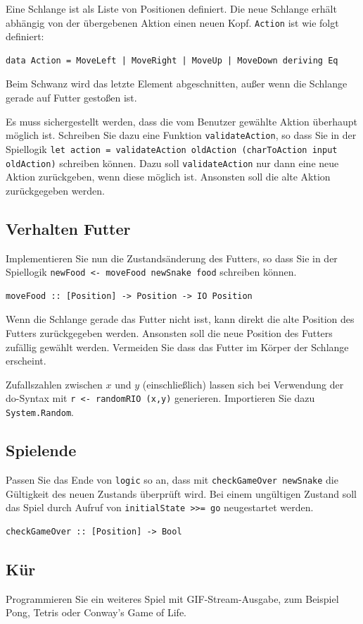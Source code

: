 \documentclass{scrartcl}
\begin{document}
Eine Schlange ist als Liste von Positionen definiert.
Die neue Schlange erhält abhängig von der übergebenen Aktion einen neuen Kopf.
\texttt{Action} ist wie folgt definiert:

\begin{lstlisting}
data Action = MoveLeft | MoveRight | MoveUp | MoveDown deriving Eq
\end{lstlisting}

Beim Schwanz wird das letzte Element abgeschnitten, außer wenn die Schlange gerade auf Futter gestoßen ist.

Es muss sichergestellt werden, dass die vom Benutzer gewählte Aktion überhaupt möglich ist.
Schreiben Sie dazu eine Funktion \texttt{validateAction}, so dass Sie in der Spiellogik \texttt{let action = validateAction oldAction (charToAction input oldAction)} schreiben können.
Dazu soll \texttt{validateAction} nur dann eine neue Aktion zurückgeben, wenn diese möglich ist.
Ansonsten soll die alte Aktion zurückgegeben werden.


\subsection{Verhalten Futter}
Implementieren Sie nun die Zustandsänderung des Futters, so dass Sie in der Spiellogik \texttt{newFood <- moveFood newSnake food} schreiben können.

\begin{lstlisting}
moveFood :: [Position] -> Position -> IO Position
\end{lstlisting}

Wenn die Schlange gerade das Futter nicht isst, kann direkt die alte Position des Futters zurückgegeben werden.
Ansonsten soll die neue Position des Futters zufällig gewählt werden.
Vermeiden Sie dass das Futter im Körper der Schlange erscheint.

Zufallszahlen zwischen $x$ und $y$ (einschließlich) lassen sich bei Verwendung der do-Syntax mit \texttt{r <- randomRIO (x,y)} generieren.
Importieren Sie dazu \texttt{System.Random}.

\subsection{Spielende}
Passen Sie das Ende von \texttt{logic} so an, dass mit \texttt{checkGameOver newSnake} die Gültigkeit des neuen Zustands überprüft wird.
Bei einem ungültigen Zustand soll das Spiel durch Aufruf von \texttt{initialState >{}>= go} neugestartet werden.

\begin{lstlisting}
checkGameOver :: [Position] -> Bool
\end{lstlisting}

\subsection{Kür}
Programmieren Sie ein weiteres Spiel mit GIF-Stream-Ausgabe, zum Beispiel Pong, Tetris oder Conway's Game of Life.
\end{document}
